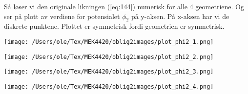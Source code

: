Så løser vi den originale likningen (\ref{eq:144}) numerisk for alle 4 geometriene. Og ser på plott av verdiene for potensialet $\phi_2$ på y-aksen. På x-aksen har vi de diskrete punktene. Plottet er symmetrisk fordi geometrien er symmetrisk.

\noindent
\begin{minipage}[t]{0.45\linewidth}
    \texttt{[image: /Users/ole/Tex/MEK4420/oblig2images/plot\_phi2\_1.png]}
\end{minipage}
\hspace{0.05\linewidth}
\begin{minipage}[t]{0.45\linewidth}
    \texttt{[image: /Users/ole/Tex/MEK4420/oblig2images/plot\_phi2\_2.png]}
\end{minipage}

\vspace{0.5cm} %

\noindent
\begin{minipage}[t]{0.45\linewidth}
    \texttt{[image: /Users/ole/Tex/MEK4420/oblig2images/plot\_phi2\_3.png]}
\end{minipage}
\hspace{0.05\linewidth}
\begin{minipage}[t]{0.45\linewidth}
    \texttt{[image: /Users/ole/Tex/MEK4420/oblig2images/plot\_phi2\_4.png]}
\end{minipage}